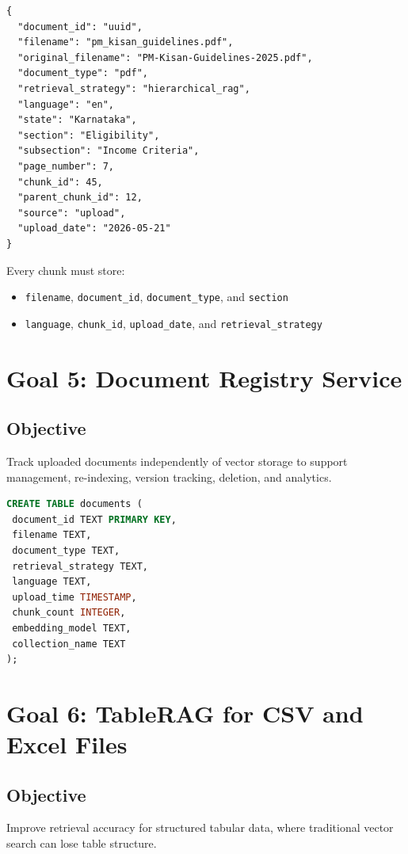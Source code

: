\documentclass[11pt]{article}
\begin{document}
\begin{lstlisting}[language={},caption={Example metadata record.}]
{
  "document_id": "uuid",
  "filename": "pm_kisan_guidelines.pdf",
  "original_filename": "PM-Kisan-Guidelines-2025.pdf",
  "document_type": "pdf",
  "retrieval_strategy": "hierarchical_rag",
  "language": "en",
  "state": "Karnataka",
  "section": "Eligibility",
  "subsection": "Income Criteria",
  "page_number": 7,
  "chunk_id": 45,
  "parent_chunk_id": 12,
  "source": "upload",
  "upload_date": "2026-05-21"
}
\end{lstlisting}

Every chunk must store:
\begin{itemize}
  \item \texttt{filename}, \texttt{document\_id}, \texttt{document\_type}, and \texttt{section}
  \item \texttt{language}, \texttt{chunk\_id}, \texttt{upload\_date}, and \texttt{retrieval\_strategy}
\end{itemize}

\section{Goal 5: Document Registry Service}

\subsection{Objective}
Track uploaded documents independently of vector storage to support management,
re-indexing, version tracking, deletion, and analytics.

\begin{lstlisting}[language=SQL,caption={SQLite document registry.}]
CREATE TABLE documents (
 document_id TEXT PRIMARY KEY,
 filename TEXT,
 document_type TEXT,
 retrieval_strategy TEXT,
 language TEXT,
 upload_time TIMESTAMP,
 chunk_count INTEGER,
 embedding_model TEXT,
 collection_name TEXT
);
\end{lstlisting}

\section{Goal 6: TableRAG for CSV and Excel Files}

\subsection{Objective}
Improve retrieval accuracy for structured tabular data, where traditional vector search
can lose table structure.
\end{document}
